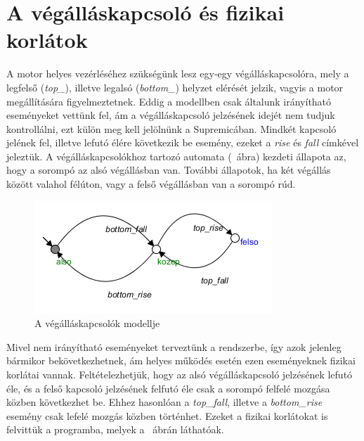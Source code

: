 \newpage
\section{A végálláskapcsoló és fizikai korlátok}
A motor helyes vezérléséhez szükségünk lesz egy-egy végálláskapcsolóra, mely a legfelső (\textit{top\_}), illetve legalsó (\textit{bottom\_}) helyzet elérését jelzik, vagyis a motor megállítására figyelmeztetnek. Eddig a modellben csak általunk irányítható eseményeket vettünk fel, ám a végálláskapcsoló jelzésének idejét nem tudjuk kontrollálni, ezt külön meg kell jelölnünk a Supremicában. Mindkét kapcsoló jelének fel, illetve lefutó élére következik be esemény, ezeket a \textit{rise} és \textit{fall} címkével jeleztük. A végálláskapcsolókhoz tartozó automata (~ábra) kezdeti állapota az, hogy a sorompó az alsó végállásban van. További állapotok, ha két végállás között valahol félúton, vagy a felső végállásban van a sorompó rúd.
\begin{figure}
	\centering
	\includegraphics[keepaspectratio]{figures/2m03/b2_limit.png}
	\caption{A végálláskapcsolók modellje}
	\label{fig:Limit}
\end{figure}
Mivel nem irányítható eseményeket terveztünk a rendszerbe, így azok jelenleg bármikor bekövetkezhetnek, ám helyes működés esetén ezen eseményeknek fizikai korlátai vannak. Feltételezhetjük, hogy az alsó végálláskapcsoló jelzésének lefutó éle, és a felső kapcsoló jelzésének felfutó éle csak a sorompó felfelé mozgása közben következhet be. Ehhez hasonlóan a \textit{top\_fall}, illetve a \textit{bottom\_rise} esemény csak lefelé mozgás közben történhet. Ezeket a fizikai korlátokat is felvittük a programba, melyek a ~ábrán láthatóak.


